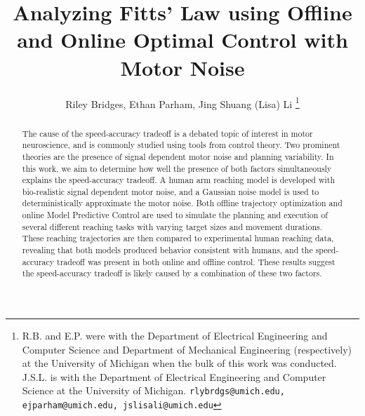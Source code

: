 \documentclass[letterpaper, 10pt, conference]{ieeeconf}
\title{\LARGE \bf Analyzing Fitts' Law using Offline and Online Optimal Control with Motor Noise}
\author{Riley Bridges, Ethan Parham, Jing Shuang (Lisa) Li 
\thanks{R.B. and E.P. were with the Department of Electrical Engineering and Computer Science and Department of Mechanical Engineering (respectively) at the University of Michigan when the bulk of this work was conducted. J.S.L. is with the Department of Electrical Engineering and Computer Science at the University of Michigan. {\tt\small rlybrdgs@umich.edu, ejparham@umich.edu, jslisali@umich.edu}}
}
\begin{document}
\maketitle
\thispagestyle{plain}
\pagestyle{plain}

\begin{abstract}
The cause of the speed-accuracy tradeoff is a debated topic of interest in motor neuroscience, and is commonly studied using tools from control theory. Two prominent theories are the presence of signal dependent motor noise and planning variability. In this work, we aim to determine how well the presence of both factors simultaneously explains the speed-accuracy tradeoff. A human arm reaching model is developed with bio-realistic signal dependent motor noise, and a Gaussian noise model is used to deterministically approximate the motor noise. Both offline trajectory optimization and online Model Predictive Control are used to simulate the planning and execution of several different reaching tasks with varying target sizes and movement durations. These reaching trajectories are then compared to experimental human reaching data, revealing that both models produced behavior consistent with humans, and the speed-accuracy tradeoff was present in both online and offline control. These results suggest the speed-accuracy tradeoff is likely caused by a combination of these two factors.
\end{abstract}
\end{document}

